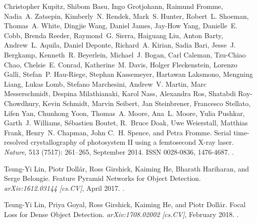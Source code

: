\documentclass[a4paper]{article}
\begin{document}
\begin{thebibliography}{33}
Christopher Kupitz, Shibom Basu, Ingo Grotjohann, Raimund Fromme, Nadia~A.
  Zatsepin, Kimberly~N. Rendek, Mark~S. Hunter, Robert~L. Shoeman, Thomas~A.
  White, Dingjie Wang, Daniel James, Jay-How Yang, Danielle~E. Cobb, Brenda
  Reeder, Raymond~G. Sierra, Haiguang Liu, Anton Barty, Andrew~L. Aquila,
  Daniel Deponte, Richard~A. Kirian, Sadia Bari, Jesse~J. Bergkamp, Kenneth~R.
  Beyerlein, Michael~J. Bogan, Carl Caleman, Tzu-Chiao Chao, Chelsie~E. Conrad,
  Katherine~M. Davis, Holger Fleckenstein, Lorenzo Galli, Stefan~P.
  {Hau-Riege}, Stephan Kassemeyer, Hartawan Laksmono, Mengning Liang, Lukas
  Lomb, Stefano Marchesini, Andrew~V. Martin, Marc Messerschmidt, Despina
  Milathianaki, Karol Nass, Alexandra Ros, Shatabdi {Roy-Chowdhury}, Kevin
  Schmidt, Marvin Seibert, Jan Steinbrener, Francesco Stellato, Lifen Yan,
  Chunhong Yoon, Thomas~A. Moore, Ana~L. Moore, Yulia Pushkar, Garth~J.
  Williams, S{\'e}bastien Boutet, R.~Bruce Doak, Uwe Weierstall, Matthias
  Frank, Henry~N. Chapman, John C.~H. Spence, and Petra Fromme.
\newblock Serial time-resolved crystallography of photosystem {{II}} using a
  femtosecond {{X-ray}} laser.
\newblock \emph{Nature}, 513 (7517): 261--265, September
  2014.
\newblock ISSN 0028-0836, 1476-4687.
\newblock {}.

Tsung-Yi Lin, Piotr Doll{\'a}r, Ross Girshick, Kaiming He, Bharath Hariharan,
  and Serge Belongie.
\newblock Feature {{Pyramid Networks}} for {{Object Detection}}.
\newblock \emph{arXiv:1612.03144 [cs.CV]}, April 2017.
\newblock {}.

Tsung-Yi Lin, Priya Goyal, Ross Girshick, Kaiming He, and Piotr Doll{\'a}r.
\newblock Focal {{Loss}} for {{Dense Object Detection}}.
\newblock \emph{arXiv:1708.02002 [cs.CV]}, February 2018.
\newblock {}.


\end{thebibliography}
\end{document}
